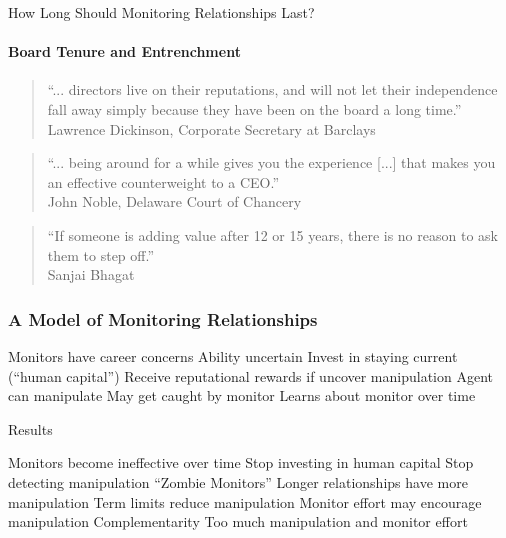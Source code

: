 \documentclass[usenames,dvipsnames]{beamer}
\newcommand{\bo}{\begin{outline}}
\newcommand{\eo}{\end{outline}}
\begin{document}
\begin{frame}{How Long Should Monitoring Relationships Last?}
\framesubtitle{Board Tenure and Entrenchment}

        

\begin{quote}
``... directors live on their reputations, and will not let their independence fall away simply because they have been on the board a long time.'' \\
\hfill Lawrence Dickinson, Corporate Secretary at Barclays 
\end{quote}

\begin{quote}
        ``... being around for a while gives you the experience [...] that makes you an effective counterweight to a CEO.'' \\
        \hfill John Noble, Delaware Court of Chancery
\end{quote}

\begin{quote}
        ``If someone is adding value after 12 or 15 years, there is no reason to ask them to step off.'' \\
        \hfill Sanjai Bhagat
\end{quote}


\end{frame}


\begin{frame}\frametitle{A Model of Monitoring Relationships}
\bo
\1 Monitors have career concerns
\2 Ability uncertain
\2 Invest in staying current (``human capital'')
\2 Receive reputational rewards if uncover manipulation
\1 Agent can manipulate
\2 May get caught by monitor
\2 Learns about monitor over time
\eo
\end{frame}

\begin{frame}{Results}
\bo
\1 Monitors become ineffective over time
\2 Stop investing in human capital
\2 Stop detecting manipulation
\2 ``Zombie Monitors''
\1 Longer relationships have more manipulation
\2 Term limits reduce manipulation
\1 Monitor effort may encourage manipulation
\2 Complementarity
\2 Too much manipulation and monitor effort 
\eo
\end{frame}
\end{document}
